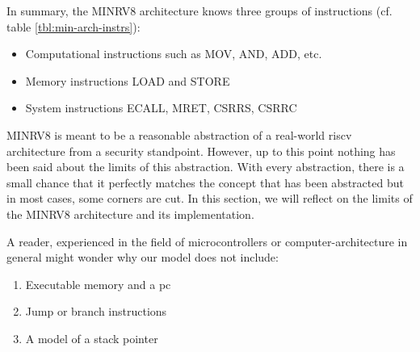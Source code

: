 In summary, the MINRV8 architecture knows three groups of instructions (cf. table \ref{tbl:min-arch-instrs}):
\begin{itemize}
    \item Computational instructions such as MOV, AND, ADD, etc.
    \item Memory instructions LOAD and STORE
    \item System instructions ECALL, MRET, CSRRS, CSRRC
\end{itemize}

MINRV8 is meant to be a reasonable abstraction of a real-world \gls{riscv} architecture from a security standpoint.
However, up to this point nothing has been said about the limits of this abstraction.
With every abstraction, there is a small chance that it perfectly matches the concept that has been abstracted but in most cases, some corners are cut.
In this section, we will reflect on the limits of the MINRV8 architecture and its implementation.


A reader, experienced in the field of microcontrollers or computer-architecture in general might wonder why our model does not include:
\begin{enumerate}
    \item Executable memory and a \gls{pc}
    \item Jump or branch instructions
    \item A model of a stack pointer
\end{enumerate}

